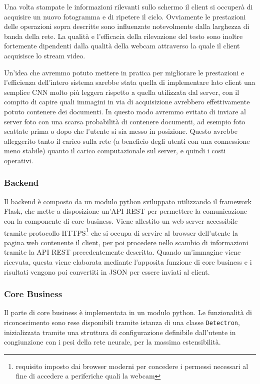 \documentclass[12pt,a4paper]{article}
\begin{document}
Una volta stampate le informazioni rilevanti sullo schermo il client si
occuperà di acquisire un nuovo fotogramma e di ripetere il ciclo.
Ovviamente le prestazioni delle operazioni sopra descritte sono
influenzate notevolmente dalla larghezza di banda della rete. La qualità
e l'efficacia della rilevazione del testo sono inoltre fortemente
dipendenti dalla qualità della webcam attraverso la quale il client
acquisisce lo stream video.

Un'idea che avremmo potuto mettere in pratica per migliorare le
prestazioni e l'efficienza dell'intero sistema sarebbe stata quella di
implementare lato client una semplice CNN molto più leggera rispetto a
quella utilizzata dal server, con il compito di capire quali immagini in
via di acquisizione avrebbero effettivamente potuto contenere dei
documenti. In questo modo avremmo evitato di inviare al server foto con
una scarsa probabilità di contenere documenti, ad esempio foto scattate
prima o dopo che l'utente si sia messo in posizione. Questo avrebbe
alleggerito tanto il carico sulla rete (a beneficio degli utenti con una
connessione meno stabile) quanto il carico computazionale sul server, e
quindi i costi operativi.

\subsubsection{Backend}

Il backend è composto da un modulo python sviluppato utilizzando il
framework Flask, che mette a disposizione un'API REST per permettere la
comunicazione con la componente di core business. Viene allestito un web
server accessibile tramite protocollo HTTPS\footnote{requisito imposto
dai browser moderni per concedere i permessi necessari al fine di
accedere a periferiche quali la webcam} che si occupa di servire al
browser dell'utente la pagina web contenente il client, per poi
procedere nello scambio di informazioni tramite la API REST
precedentemente descritta. Quando un'immagine viene ricevuta, questa
viene elaborata mediante l'apposita funzione di core business e i
risultati vengono poi convertiti in JSON per essere inviati al client.

\subsubsection{Core Business}

Il parte di core business è implementata in un modulo python. Le
funzionalità di riconoscimento sono rese disponibili tramite istanza di
una classe \texttt{Detectron}, inizializzata tramite una struttura di
configurazione definibile dall'utente in congiunzione con i pesi della
rete neurale, per la massima estensibilità.
\end{document}
